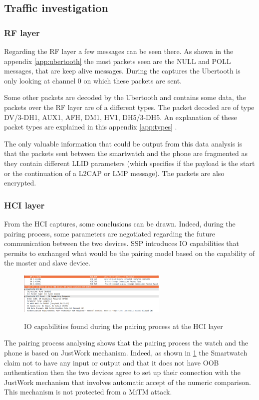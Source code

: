 \subsection{Traffic investigation}
\subsubsection{RF layer}
\label{subsubsection:rflayer}
Regarding the RF layer a few messages can be seen there. As shown in the appendix \ref{app:ubertooth} the most packets seen are the NULL and POLL messages, that are keep alive messages. During the captures the Ubertooth is only looking at channel 0 on which these packets are sent.

Some other packets are decoded by the Ubertooth and contains some data, the packets over the RF layer are of a different types. The packet decoded are of type DV/3-DH1, AUX1, AFH, DM1, HV1, DH5/3-DH5. An explanation of these packet types are explained in this appendix \ref{app:types} .

The only valuable information that could be output from this data analysis is that the packets sent between the smartwatch and the phone are fragmented as they contain different LLID parameters (which specifies if the payload is the start or the continuation of a L2CAP or LMP message). The packets are also encrypted.

\subsubsection{HCI layer}
From the HCI captures, some conclusions can be drawn. Indeed, during the pairing process, some parameters are negotiated regarding the future communication between the two devices. SSP introduces IO capabilities that permits to exchanged what would be the pairing model based on the capability of the master and slave device. 
\begin{figure}[!h]
  \begin{center}
	\includegraphics[width=270px]{images/IO_PARAM.png}
	\label{fig:io}
	\caption{IO capabilities found during the pairing process at the HCI layer}
  \end{center}
\end{figure}
The pairing process analysing shows that the pairing process the watch and the phone is based on JustWork mechanism. Indeed, as shown in \ref{fig:io} the Smartwatch claim not to have any input or output and that it does not have OOB authentication then the two devices agree to set up their connection with the JustWork mechanism that involves automatic accept of the numeric comparison. This mechanism is not protected from a MiTM attack.

